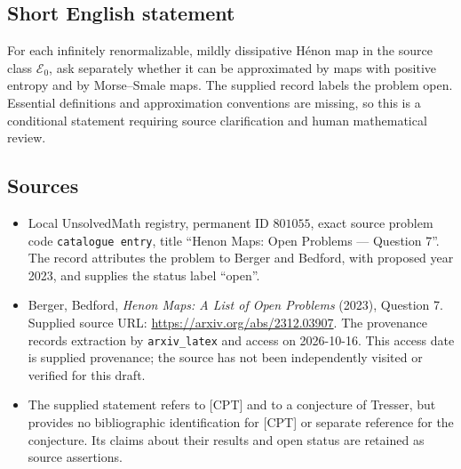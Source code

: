 \documentclass[11pt]{article}
\begin{document}
\subsection{Short English statement}
For each infinitely renormalizable, mildly dissipative Hénon map in the source class \(\mathcal E_0\), ask separately whether it can be approximated by maps with positive entropy and by Morse--Smale maps. The supplied record labels the problem open. Essential definitions and approximation conventions are missing, so this is a conditional statement requiring source clarification and human mathematical review.
\subsection{Sources}
\begin{itemize}
\item Local UnsolvedMath registry, permanent ID \(801055\), exact source problem code \texttt{catalogue entry}, title ``Henon Maps: Open Problems --- Question 7''. The record attributes the problem to Berger and Bedford, with proposed year 2023, and supplies the status label ``open''.
\item Berger, Bedford, \emph{Henon Maps: A List of Open Problems} (2023), Question 7. Supplied source URL: \url{https://arxiv.org/abs/2312.03907}. The provenance records extraction by \texttt{arxiv\_latex} and access on 2026-10-16. This access date is supplied provenance; the source has not been independently visited or verified for this draft.
\item The supplied statement refers to [CPT] and to a conjecture of Tresser, but provides no bibliographic identification for [CPT] or separate reference for the conjecture. Its claims about their results and open status are retained as source assertions.
\end{itemize}
\end{document}
